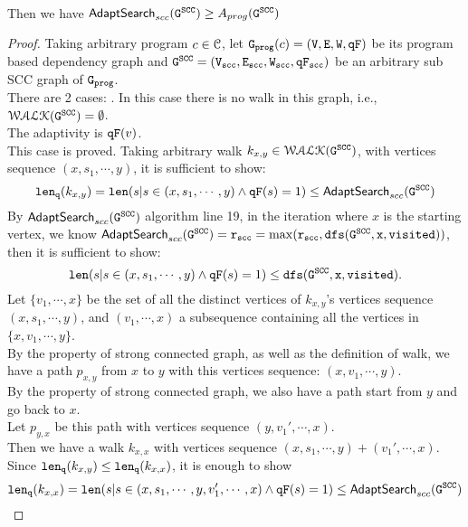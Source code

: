 \\
Then we have
$\mathsf{AdaptSearch}_{scc}(\mathtt{G^{SCC}}) \geq A_{{prog}}(\mathtt{G^{SCC}})$
\\
\begin{proof}
  Taking arbitrary program $c \in \mathcal{C}$, let $\mathtt{{G_{prog}}}(c) = (\mathtt{V}, \mathtt{E}, \mathtt{W}, \mathtt{qF})$ be its 
  program based dependency graph and $\mathtt{G^{SCC}} = (\mathtt{{V_{scc}}}, \mathtt{{E_{scc}}}, \mathtt{{W_{scc}}}, \mathtt{{qF_{scc}}})$ be an arbitrary sub SCC graph of $\mathtt{{G_{prog}}}$.
  \\
There are 2 cases:
.
%
In this case there is no walk in this graph, i.e., $\mathcal{WALK}(\mathtt{G^{SCC}}) = \emptyset$.
\\
The adaptivity is $\mathtt{qF}(v)$.
\\
This case is proved.
%
  Taking arbitrary walk $k_{x,y} \in \mathcal{WALK}{(\mathtt{G^{SCC}}})$, with vertices sequence
  $(x, s_1, \cdots, y)$, it is sufficient to show:
  \[
    \mathtt{len}_{\tt q}(k_{x,y}) = \mathtt{len}(s | s \in (x, s_1, \cdots, y) \land \mathtt{qF}(s) = 1) \leq \mathsf{AdaptSearch}_{scc}(\mathtt{G^{SCC}})
  \]
  By $\mathsf{AdaptSearch}_{scc}(\mathtt{G^{SCC}})$ algorithm line 19, in the iteration where $x$ is the starting vertex,
  we know $\mathsf{AdaptSearch}_{scc}(\mathtt{G^{SCC}}) = \mathtt{r_{scc}} = \max(\mathtt{r_{scc}, \mathtt{dfs(\mathtt{G^{SCC}}, x, visited)}})$,
  then it is sufficient to show:
  $$
  \mathtt{len}(s | s \in (x, s_1, \cdots, y) \land \mathtt{qF}(s) = 1) \leq \mathtt{dfs(\mathtt{G^{SCC}}, x, visited)}.
  $$
  Let  $\{v_1, \cdots, x\}$ be the set of all the distinct vertices of $k_{x,y}$'s vertices sequence $(x, s_1, \cdots, y)$, and 
  $(v_1, \cdots, x)$ a subsequence containing all the vertices in $\{x, v_1, \cdots, y\}$.
  \\
  By the property of strong connected graph, as well as the definition of walk,
  we have a path $p_{x,y} $ from $x$ to $y$ with this vertices sequence: $(x, v_1, \cdots, y)$.
  \\
  By the property of strong connected graph, we also have a path start from $y$ and go back to $x$.
  \\
  Let $p_{y, x}$ be this path with vertices sequence $(y, v_1', \cdots, x)$.
  \\
  Then we have a walk $k_{x,x}$ with vertices sequence $(x, s_1, \cdots, y) + (v_1', \cdots, x)$.
  \\
  Since $\mathtt{len}_{\tt q}(k_{x,y}) \leq \mathtt{len}_{\tt q}(k_{x,x})$,
  it is enough to show 
  $$
  \mathtt{len}_{\tt q}(k_{x,x}) = \mathtt{len}(s | s \in (x, s_1, \cdots, y, v_1', \cdots, x) \land \mathtt{qF}(s) = 1) \leq \mathsf{AdaptSearch}_{scc}(\mathtt{G^{SCC}})
$$
\end{proof}
